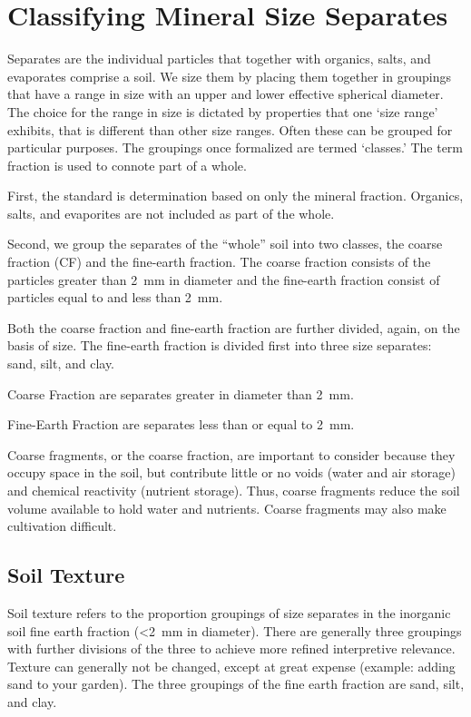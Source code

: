 \documentclass[a5paper]{book}
\begin{document}
\section{Classifying Mineral Size Separates}
    
Separates are the individual particles that together with organics, salts, and evaporates comprise a soil. We size them by placing them together in groupings that have a range in size with an upper and lower effective spherical diameter. The choice for the range in size is dictated by properties that one ‘size range’ exhibits, that is different than other size ranges. Often these can be grouped for particular purposes. The groupings once formalized are termed ‘classes.’ The term fraction is used to connote part of a whole.
    
First, the standard is determination based on only the mineral fraction. Organics, salts, and evaporites are not included as part of the whole.
    
Second, we group the separates of the “whole” soil into two classes, the coarse fraction (CF) and the fine-earth fraction. The coarse fraction consists of the particles greater than \SI{2}{\milli\metre} in diameter and the fine-earth fraction consist of particles equal to and less than \SI{2}{\milli\metre}.
    
Both the coarse fraction and fine-earth fraction are further divided, again, on the basis of size. The fine-earth fraction is divided first into three size separates: sand, silt, and clay.
    
Coarse Fraction are separates greater in diameter than \SI{2}{\milli\metre}.
    
Fine-Earth Fraction are separates less than or equal to \SI{2}{\milli\metre}.
    
Coarse fragments, or the coarse fraction, are important to consider because they occupy space in the soil, but contribute little or no voids (water and air storage) and chemical reactivity (nutrient storage). Thus, coarse fragments reduce the soil volume available to hold water and nutrients. Coarse fragments may also make cultivation difficult.

\subsection{Soil Texture}
    
Soil texture refers to the proportion groupings of size separates in the inorganic soil fine earth fraction (\textless \SI{2}{\milli\metre} in diameter). There are generally three groupings with further divisions of the three to achieve more refined interpretive relevance. Texture can generally not be changed, except at great expense (example: adding sand to your garden). The three groupings of the fine earth fraction are sand, silt, and clay.
    
\end{document}
